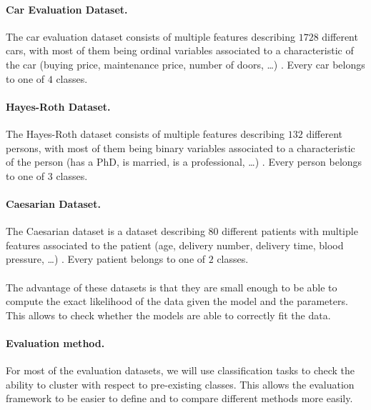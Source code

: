 \documentclass[a4paper,12pt]{article}
\begin{document}
\paragraph{Car Evaluation Dataset.} The car evaluation dataset consists of multiple features describing $1728$ different cars, with most of them being ordinal variables associated to a characteristic of the car (buying price, maintenance price, number of doors, \ldots) \citep{misc_car_evaluation_19}. Every car belongs to one of $4$ classes.
\paragraph{Hayes-Roth Dataset.} The Hayes-Roth dataset consists of multiple features describing $132$ different persons, with most of them being binary variables associated to a characteristic of the person (has a PhD, is married, is a professional, \ldots) \citep{misc_hayes_roth_44}. Every person belongs to one of $3$ classes.
\paragraph{Caesarian Dataset.} The Caesarian dataset is a dataset describing $80$ different patients with multiple features associated to the patient (age, delivery number, delivery time, blood pressure, \ldots) \citep{misc_caesarian_section_classification_dataset_472}. Every patient belongs to one of $2$ classes. \\ \\
The advantage of these datasets is that they are small enough to be able to compute the exact likelihood of the data given the model and the parameters. This allows to check whether the models are able to correctly fit the data.

\paragraph{Evaluation method.} For most of the evaluation datasets, we will use classification tasks to check the ability to cluster with respect to pre-existing classes. This allows the evaluation framework to be easier to define and to compare different methods more easily. 
\end{document}

